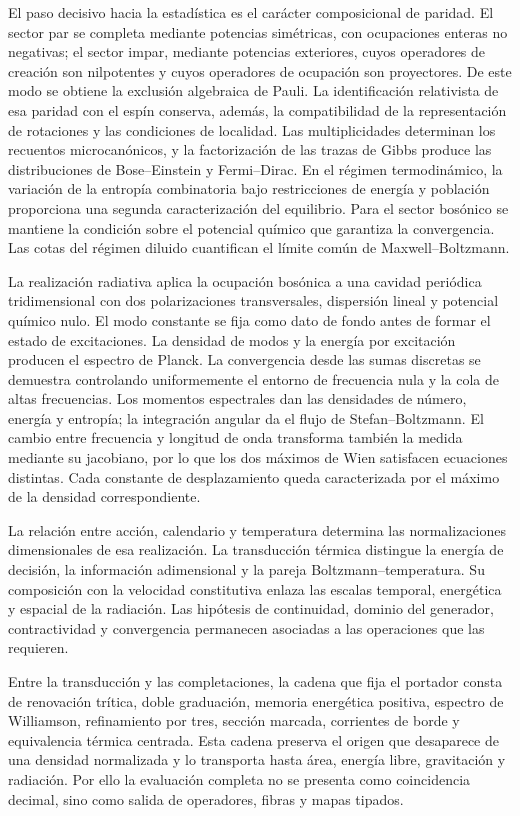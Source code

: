El paso decisivo hacia la estadística es el carácter composicional de
paridad. El sector par se completa mediante potencias simétricas, con
ocupaciones enteras no negativas; el sector impar, mediante potencias
exteriores, cuyos operadores de creación son nilpotentes y cuyos
operadores de ocupación son proyectores. De este modo se obtiene la
exclusión algebraica de Pauli. La identificación relativista de esa
paridad con el espín conserva, además, la compatibilidad de la
representación de rotaciones y las condiciones de localidad. Las multiplicidades determinan los recuentos microcanónicos, y la
factorización de las trazas de Gibbs produce las distribuciones de
Bose--Einstein y Fermi--Dirac. En el régimen termodinámico, la variación
de la entropía combinatoria bajo restricciones de energía y población
proporciona una segunda caracterización del equilibrio. Para el sector bosónico se mantiene la
condición sobre el potencial químico que garantiza la convergencia.
Las cotas del régimen diluido cuantifican el límite común de
Maxwell--Boltzmann.

La realización radiativa aplica la ocupación bosónica a una cavidad
periódica tridimensional con dos polarizaciones transversales, dispersión
lineal y potencial químico nulo. El modo constante se fija como dato de
fondo antes de formar el estado de excitaciones. La densidad de modos y
la energía por excitación producen el espectro de Planck. La convergencia
desde las sumas discretas se demuestra controlando uniformemente el
entorno de frecuencia nula y la cola de altas frecuencias. Los momentos
espectrales dan las densidades de número, energía y entropía; la
integración angular da el flujo de Stefan--Boltzmann. El cambio entre
frecuencia y longitud de onda transforma también la medida mediante su
jacobiano, por lo que los dos máximos de Wien satisfacen ecuaciones
distintas. Cada constante de desplazamiento queda caracterizada por el
máximo de la densidad correspondiente.

La relación entre acción, calendario y temperatura determina las
normalizaciones dimensionales de esa realización. La transducción
térmica distingue la energía de decisión, la información adimensional y
la pareja Boltzmann--temperatura. Su composición con la velocidad
constitutiva enlaza las escalas temporal, energética y espacial de la
radiación. Las hipótesis de continuidad, dominio del generador,
contractividad y convergencia permanecen asociadas a las operaciones
que las requieren.

Entre la transducción y las completaciones, la cadena que fija el portador
consta de renovación trítica, doble graduación, memoria energética positiva,
espectro de Williamson, refinamiento por tres, sección marcada, corrientes de
borde y equivalencia térmica centrada. Esta cadena preserva el
origen que desaparece de una densidad normalizada y lo transporta hasta área,
energía libre, gravitación y radiación. Por ello la evaluación completa no se
presenta como coincidencia decimal, sino como salida de operadores, fibras y
mapas tipados.

